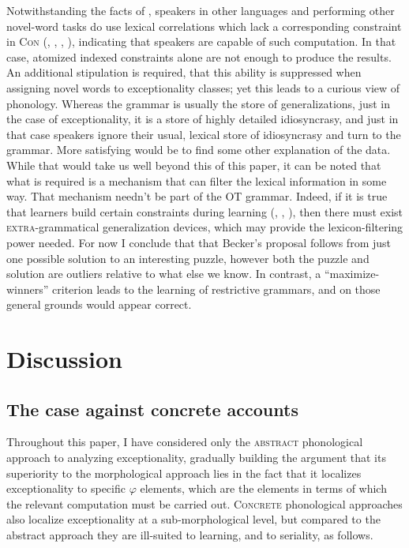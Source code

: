 \documentclass[output=paper,
modfonts
]{LSP/langsci}
\begin{document}
Notwithstanding the facts of , speakers in other languages and performing other novel-word tasks do use lexical correlations which lack a corresponding constraint in \textsc{Con} (\citealt{moreton1999}, \citealt{albright2002b}, \citealt{albrighthayes2002}, \citealt{ernestus2003}), indicating that speakers are capable of such computation. In that case, atomized indexed constraints alone are not enough to produce the  results. An additional stipulation is required, that this ability is suppressed when assigning novel words to exceptionality classes; yet this leads to a curious view of phonology. Whereas the grammar is usually the store of generalizations, just in the case of exceptionality, it is a store of highly detailed idiosyncrasy, and just in that case speakers ignore their usual, lexical store of idiosyncrasy and turn to the grammar. More satisfying would be to find some other explanation of the  data. While that would take us well beyond this  of this paper, it can be noted that what is required is a mechanism that can filter the lexical information in some way. That mechanism needn't be part of the OT grammar. Indeed, if it is true that learners build certain constraints during learning (\citealt{flack2007r}, \citealt{hayes2008}, \citealt{hayes2014}), then there must exist \textsc{extra}-grammatical generalization devices, which may provide the lexicon-filtering power needed. For now I conclude that that Becker's proposal follows from just one possible solution to an interesting puzzle, however both the puzzle and solution are outliers relative to what else we know. In contrast, a ``maximize-winners'' criterion leads to the learning of restrictive grammars, and on those general grounds would appear correct.

\section[Discussion]{Discussion}\label{sec:round:9}
\label{bkm:Ref335654326}\subsection[The case against concrete accounts]{The case against concrete accounts}\label{sec:round:9.1}
\label{bkm:Ref336973108}
Throughout this paper, I have considered only the \textsc{abstract} phonological approach to analyzing exceptionality, gradually building the argument that its superiority to the morphological approach lies in the fact that it localizes exceptionality to specific $\varphi $ elements, which are the elements in terms of which the relevant computation must be carried out. \textsc{Concrete} phonological approaches also localize exceptionality at a sub-morphological level, but compared to the abstract approach they are ill-suited to learning, and to seriality, as follows. 
\end{document}
